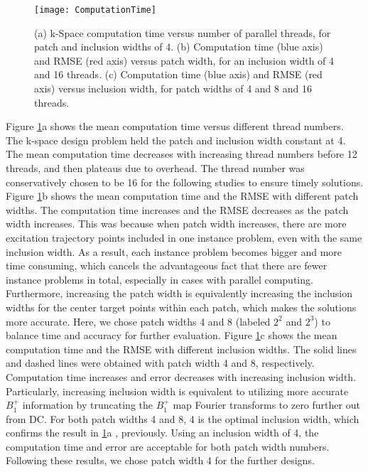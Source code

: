 \begin{figure}
	\centering
	\texttt{[image: ComputationTime]}
	\caption{(a) k-Space computation time versus number of parallel threads, for patch and inclusion widths of 4. 
	(b) Computation time (blue axis) and RMSE (red axis) versus patch width, for an inclusion width of 4 and 16 threads. 
	(c) Computation time (blue axis) and RMSE (red axis) versus inclusion width, for patch widths of 4 and 8 and 16 threads.}
	\label{fig:ComputationTime}
\end{figure}
Figure \ref{fig:ComputationTime}a shows the mean computation time versus different thread numbers. The k-space design problem held the patch and inclusion width constant at 4. The mean computation time decreases with increasing thread numbers before 12 threads, and then plateaus due to overhead. The thread number was conservatively chosen to be 16 for the following studies to ensure timely solutions. 
Figure \ref{fig:ComputationTime}b shows the mean computation time and the RMSE with different patch widths. The computation time increases and the RMSE decreases as the patch width increases. This was because when patch width increases, there are more excitation trajectory points included in one instance problem, even with the same inclusion width. As a result, each instance problem becomes bigger and more time consuming, which cancels the advantageous fact that there are fewer instance problems in total, especially in cases with parallel computing. Furthermore, increasing the patch width is equivalently increasing the inclusion widths for the center target points within each patch, which makes the solutions more accurate. Here, we chose patch widths 4 and 8 (labeled $2^2$ and $2^3$) to balance time and accuracy for further evaluation.
Figure \ref{fig:ComputationTime}c shows the mean computation time and the RMSE with different inclusion widths. The solid lines and dashed lines were obtained with patch width 4 and 8, respectively. Computation time increases and error decreases with increasing inclusion width. Particularly, increasing inclusion width is equivalent to utilizing more accurate $B_1^+$ information by truncating the $B_1^+$ map Fourier transforms to zero further out from DC. For both patch widths 4 and 8, 4 is the optimal inclusion width, which confirms the result in \ref{fig:ComputationTime}a , previously. Using an inclusion width of 4, the computation time and error are acceptable for both patch width numbers. Following these results,  we chose patch width 4 for the further designs.


